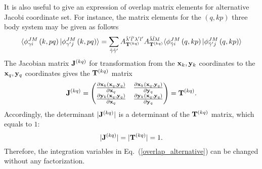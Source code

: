 \documentclass[
12pt, %
oneside, %
english, %
onehalfspacing, %
onehalfspacing, %
headsepline, %
]{MastersDoctoralThesis} %
\begin{document}
It is also useful to give an expression of overlap matrix elements for alternative Jacobi coordinate set. For instance, the matrix elements for the $(q,kp)$ three body system may be given as follows
\begin{equation}
\langle \phi^{ J M}_{\gamma i}\left(k,pq \right) \vert 
\phi^{ J M}_{\gamma^{\prime}j}\left(k,pq \right) \rangle
=
\sum_{\tilde{\gamma} \tilde{\gamma}'}
A^{\tilde{\lambda}' \tilde{l}' \lambda' l'}_{{\bf T}^{(kq)} }
A^{\tilde{\lambda} \tilde{l} \lambda l}_{{\bf T}^{(kq)} }
\langle \phi^{ J M}_{\tilde{\gamma}i}\left(q,kp \right) \vert 
\phi^{ J M}_{\tilde{\gamma}^{\prime}j}\left(q,kp \right) \rangle
\label{overlap_alternative}
\end{equation}
The Jacobian  matrix ${\bf J}^{(kq)}$ for transformation from the ${\bf x}_k, {\bf y}_k$ coordinates to the ${\bf x}_q, {\bf y}_q$ coordinates gives the ${\bf T}^{(kq)}$ matrix
\begin{equation}
{\bf J}^{(kq)} = 
\begin{pmatrix}
\frac{\partial {\bf x}_k \left({\bf x}_q,{\bf y}_q \right)}{ \partial {\bf x}_q }  
& \frac{\partial {\bf x}_k \left({\bf x}_q,{\bf y}_q \right)}{ \partial {\bf y}_q } \\
\frac{\partial {\bf y}_k \left({\bf x}_q,{\bf y}_q \right)}{ \partial {\bf x}_q }  
& \frac{\partial {\bf y}_k \left({\bf x}_q,{\bf y}_q \right)}{ \partial {\bf y}_q } 
\end{pmatrix} = {\bf T}^{(kq)}.
\end{equation}
Accordingly, the determinant $\vert {\bf J}^{(kq)} \vert$ is a determinant of the ${\bf T}^{(kq)}$ matrix, which equals to $1$:
\begin{equation}
\vert {\bf J}^{(kq)} \vert = \vert {\bf T}^{(kq)} \vert =1.
\end{equation}
  Therefore, the integration variables in Eq.~(\ref{overlap_alternative}) can be changed without any factorization. 
\end{document}

